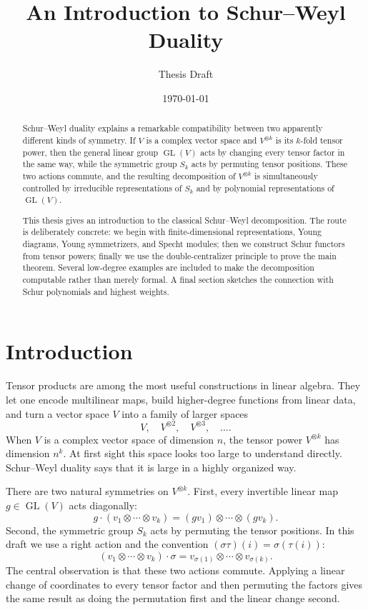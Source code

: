 \documentclass[12pt,a4paper]{article}
\title{An Introduction to Schur--Weyl Duality}
\author{Thesis Draft}
\date{\today}
\theoremstyle{definition}
\theoremstyle{remark}
\newcommand{\GL}{\operatorname{GL}}
\begin{document}
\maketitle

\begin{abstract}
Schur--Weyl duality explains a remarkable compatibility between two
apparently different kinds of symmetry.  If \(V\) is a complex vector space
and \(V^{\otimes k}\) is its \(k\)-fold tensor power, then the general linear
group \(\GL(V)\) acts by changing every tensor factor in the same way, while
the symmetric group \(S_k\) acts by permuting tensor positions.  These two
actions commute, and the resulting decomposition of \(V^{\otimes k}\) is
simultaneously controlled by irreducible representations of \(S_k\) and by
polynomial representations of \(\GL(V)\).

This thesis gives an introduction to the classical
Schur--Weyl decomposition.  The route is deliberately concrete: we begin with
finite-dimensional representations, Young diagrams, Young symmetrizers, and
Specht modules; then we construct Schur functors from tensor powers; finally
we use the double-centralizer principle to prove the main theorem.  Several
low-degree examples are included to make the decomposition computable rather
than merely formal.  A final section sketches the connection with Schur
polynomials and highest weights.
\end{abstract}

\tableofcontents

\section{Introduction}

Tensor products are among the most useful constructions in linear algebra.
They let one encode multilinear maps, build higher-degree functions from
linear data, and turn a vector space \(V\) into a family of larger spaces
\[
V,\quad V^{\otimes 2},\quad V^{\otimes 3},\quad \ldots .
\]
When \(V\) is a complex vector space of dimension \(n\), the tensor power
\(V^{\otimes k}\) has dimension \(n^k\).  At first sight this space looks too
large to understand directly.  Schur--Weyl duality says that it is large in a
highly organized way.

There are two natural symmetries on \(V^{\otimes k}\).  First, every
invertible linear map \(g\in \GL(V)\) acts diagonally:
\[
g\cdot(v_1\otimes \cdots \otimes v_k)
  =(gv_1)\otimes \cdots \otimes (gv_k).
\]
Second, the symmetric group \(S_k\) acts by permuting the tensor positions.
In this draft we use a right action and the convention
\((\sigma\tau)(i)=\sigma(\tau(i))\):
\[
(v_1\otimes \cdots \otimes v_k)\cdot \sigma
  =v_{\sigma(1)}\otimes \cdots \otimes v_{\sigma(k)}.
\]
The central observation is that these two actions commute.  Applying a
linear change of coordinates to every tensor factor and then permuting the
factors gives the same result as doing the permutation first and the linear
change second.
\end{document}

